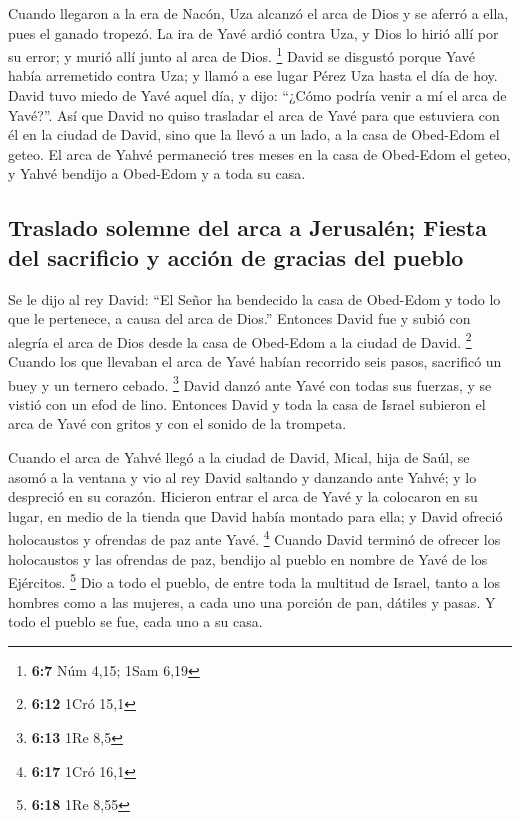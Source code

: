  Cuando llegaron a la era de Nacón, Uza alcanzó el arca de
Dios y se aferró a ella, pues el ganado tropezó.  La ira
de Yavé ardió contra Uza, y Dios lo hirió allí por su error; y murió
allí junto al arca de Dios. \footnote{\textbf{6:7} Núm 4,15; 1Sam 6,19}
 David se disgustó porque Yavé había arremetido contra
Uza; y llamó a ese lugar Pérez Uza hasta el día de hoy. 
David tuvo miedo de Yavé aquel día, y dijo: ``¿Cómo podría venir a mí el
arca de Yavé?''.  Así que David no quiso trasladar el
arca de Yavé para que estuviera con él en la ciudad de David, sino que
la llevó a un lado, a la casa de Obed-Edom el geteo.  El
arca de Yahvé permaneció tres meses en la casa de Obed-Edom el geteo, y
Yahvé bendijo a Obed-Edom y a toda su casa.

\hypertarget{traslado-solemne-del-arca-a-jerusaluxe9n-fiesta-del-sacrificio-y-acciuxf3n-de-gracias-del-pueblo}{%
\subsection{Traslado solemne del arca a Jerusalén; Fiesta del sacrificio
y acción de gracias del
pueblo}\label{traslado-solemne-del-arca-a-jerusaluxe9n-fiesta-del-sacrificio-y-acciuxf3n-de-gracias-del-pueblo}}

 Se le dijo al rey David: ``El Señor ha bendecido la casa
de Obed-Edom y todo lo que le pertenece, a causa del arca de Dios.''
Entonces David fue y subió con alegría el arca de Dios desde la casa de
Obed-Edom a la ciudad de David. \footnote{\textbf{6:12} 1Cró 15,1}
 Cuando los que llevaban el arca de Yavé habían recorrido
seis pasos, sacrificó un buey y un ternero cebado. \footnote{\textbf{6:13}
  1Re 8,5}  David danzó ante Yavé con todas sus fuerzas,
y se vistió con un efod de lino.  Entonces David y toda
la casa de Israel subieron el arca de Yavé con gritos y con el sonido de
la trompeta.

 Cuando el arca de Yahvé llegó a la ciudad de David,
Mical, hija de Saúl, se asomó a la ventana y vio al rey David saltando y
danzando ante Yahvé; y lo despreció en su corazón. 
Hicieron entrar el arca de Yavé y la colocaron en su lugar, en medio de
la tienda que David había montado para ella; y David ofreció holocaustos
y ofrendas de paz ante Yavé. \footnote{\textbf{6:17} 1Cró 16,1}
 Cuando David terminó de ofrecer los holocaustos y las
ofrendas de paz, bendijo al pueblo en nombre de Yavé de los Ejércitos.
\footnote{\textbf{6:18} 1Re 8,55}  Dio a todo el pueblo,
de entre toda la multitud de Israel, tanto a los hombres como a las
mujeres, a cada uno una porción de pan, dátiles y pasas. Y todo el
pueblo se fue, cada uno a su casa.

